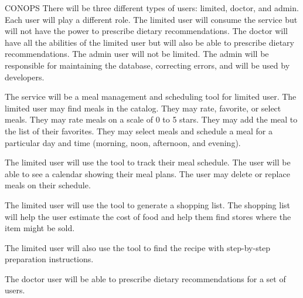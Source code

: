 \documentclass[a4paper,10pt,toc=graduated]{article}
\begin{document}
\begin{mySubsection}{CONOPS}
\noindent
There will be three different types of users: limited, doctor, and admin.
Each user will play a different role.
The limited user will consume the service but will not have the power to prescribe dietary recommendations.
The doctor will have all the abilities of the limited user but will also be able to prescribe dietary recommendations.
The admin user will not be limited.
The admin will be responsible for maintaining the database, correcting errors, and will be used by developers.
\newline

\noindent
The service will be a meal management and scheduling tool for limited user.
The limited user may find meals in the catalog.
They may rate, favorite, or select meals.
They may rate meals on a scale of 0 to 5 stars.
They may add the meal to the list of their favorites.
They may select meals and schedule a meal for a particular day and time (morning, noon, afternoon, and evening).
\newline

\noindent
The limited user will use the tool to track their meal schedule.
The user will be able to see a calendar showing their meal plans.
The user may delete or replace meals on their schedule.
\newline

\noindent
The limited user will use the tool to generate a shopping list.
The shopping list will help the user estimate the cost of food and help them find stores where the item might be sold.
\newline

\noindent
The limited user will also use the tool to find the recipe with step-by-step preparation instructions.
\newline

\noindent
The doctor user will be able to prescribe dietary recommendations for a set of users.
\end{mySubsection}
\end{document}
